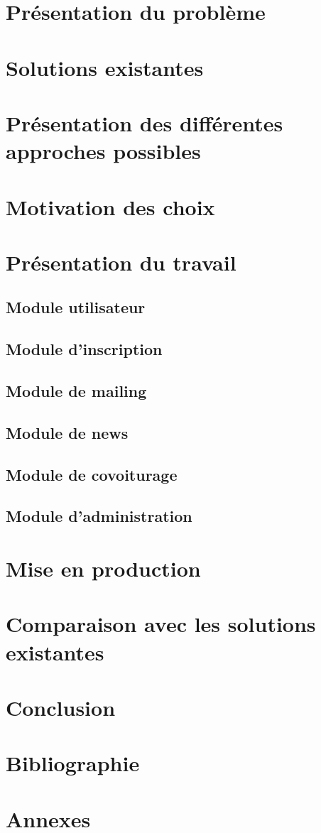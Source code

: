 \documentclass[12pt, a4paper, oneside]{article}
\begin{document}
\section{Présentation du problème}
\section{Solutions existantes}
\section{Présentation des différentes approches possibles}
\section{Motivation des choix}
\section{Présentation du travail}
\subsection{Module utilisateur}
\subsection{Module d'inscription}
\subsection{Module de mailing}
\subsection{Module de news}
\subsection{Module de covoiturage}
\subsection{Module d'administration}
\section{Mise en production}
\section{Comparaison avec les solutions existantes}
\section{Conclusion}
\section{Bibliographie}
%
%
\section{Annexes}
\end{document}
